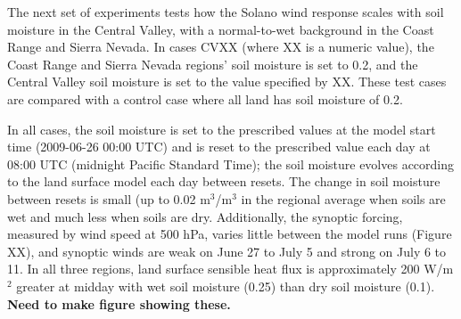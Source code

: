 The next set of experiments tests how the Solano wind response scales with soil moisture in the Central Valley, with a normal-to-wet background in the Coast Range and Sierra Nevada.  In cases CVXX (where XX is a numeric value), the Coast Range and Sierra Nevada regions' soil moisture is set to 0.2, and the Central Valley soil moisture is set to the value specified by XX.  These test cases are compared with a control case where all land has soil moisture of 0.2.

In all cases, the soil moisture is set to the prescribed values at the model start time (2009-06-26 00:00 UTC) and is reset to the prescribed value each day at 08:00 UTC (midnight Pacific Standard Time); the soil moisture evolves according to the land surface model each day between resets.  The change in soil moisture between resets is small (up to 0.02 m$^3$/m$^3$ in the regional average when soils are wet and much less when soils are dry.  Additionally, the synoptic forcing, measured by wind speed at 500 hPa, varies little between the model runs (Figure XX), and synoptic winds are weak on June 27 to July 5 and strong on July 6 to 11.  In all three regions, land surface sensible heat flux is approximately 200 W/m$^2$ greater at midday with wet soil moisture (0.25) than dry soil moisture (0.1).  \textbf{Need to make figure showing these.}


